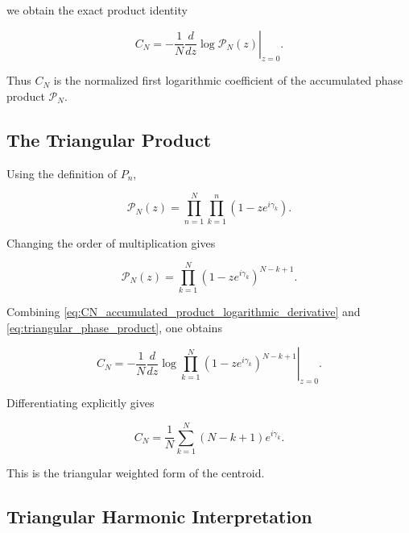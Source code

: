 \documentclass[11pt]{amsart}
\numberwithin{equation}{section}
\theoremstyle{plain}
\theoremstyle{definition}
\theoremstyle{remark}
\begin{document}
we obtain the exact product identity

\begin{equation}
C_N
=
-
\frac{1}{N}
\left.
\frac{d}{dz}
\log \mathcal{P}_N(z)
\right|_{z=0}.
\label{eq:CN_accumulated_product_logarithmic_derivative}
\end{equation}

Thus \(C_N\) is the normalized first logarithmic coefficient of the
accumulated phase product \(\mathcal{P}_N\).

\subsection{The Triangular Product}
\label{subsec:triangular_phase_product}

Using the definition of \(P_n\),

\begin{equation}
\mathcal{P}_N(z)
=
\prod_{n=1}^{N}
\prod_{k=1}^{n}
\left(1-z e^{i\gamma_k}\right).
\label{eq:accumulated_phase_product_double_product}
\end{equation}

Changing the order of multiplication gives

\begin{equation}
\mathcal{P}_N(z)
=
\prod_{k=1}^{N}
\left(1-z e^{i\gamma_k}\right)^{N-k+1}.
\label{eq:triangular_phase_product}
\end{equation}

Combining
\eqref{eq:CN_accumulated_product_logarithmic_derivative}
and
\eqref{eq:triangular_phase_product},
one obtains

\begin{equation}
C_N
=
-
\frac{1}{N}
\left.
\frac{d}{dz}
\log
\prod_{k=1}^{N}
\left(1-z e^{i\gamma_k}\right)^{N-k+1}
\right|_{z=0}.
\label{eq:CN_triangular_product_logarithmic_derivative}
\end{equation}

Differentiating explicitly gives

\begin{equation}
C_N
=
\frac{1}{N}
\sum_{k=1}^{N}
(N-k+1)e^{i\gamma_k}.
\label{eq:CN_triangular_weighted_sum}
\end{equation}

This is the triangular weighted form of the centroid.

\subsection{Triangular Harmonic Interpretation}
\label{subsec:triangular_harmonic_interpretation}
\end{document}
